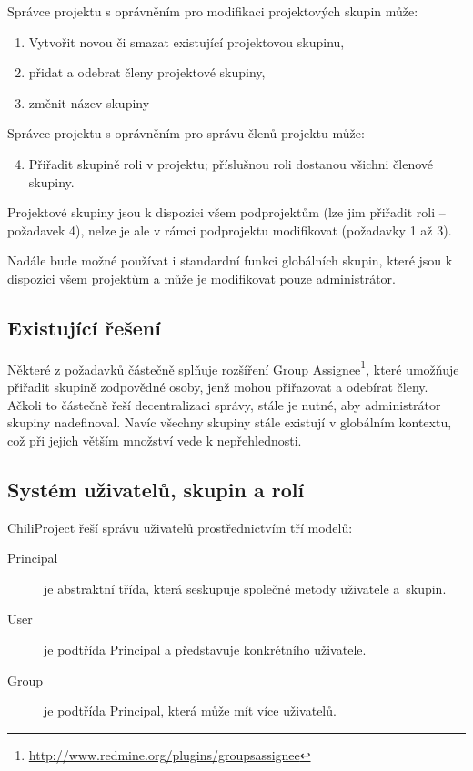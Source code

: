 \documentclass[thesis=B,czech]{FITthesis}[2012/05/02]
\begin{document}
Správce projektu s oprávněním pro modifikaci projektových skupin může:

\begin{enumerate}[1.]
\item
  Vytvořit novou či smazat existující projektovou skupinu,
\item
  přidat a odebrat členy projektové skupiny,
\item
  změnit název skupiny
\end{enumerate}
Správce projektu s oprávněním pro správu členů projektu může:

\begin{enumerate}[1.]
\setcounter{enumi}{3}
\item
  Přiřadit skupině roli v projektu; příslušnou roli dostanou všichni
  členové skupiny.
\end{enumerate}
Projektové skupiny jsou k dispozici všem podprojektům (lze jim přiřadit
roli -- požadavek 4), nelze je ale v rámci podprojektu modifikovat
(požadavky 1 až 3).

Nadále bude možné používat i standardní funkci globálních skupin, které
jsou k dispozici všem projektům a může je modifikovat pouze
administrátor.

\subsection{Existující řešení}

Některé z požadavků částečně splňuje rozšíření Group Assignee\footnote{\url{http://www.redmine.org/plugins/groupsassignee}},
které umožňuje přiřadit skupině zodpovědné osoby, jenž mohou přiřazovat a
odebírat členy. Ačkoli to částečně řeší decentralizaci správy, stále je
nutné, aby administrátor skupiny nadefinoval. Navíc všechny skupiny stále
existují v globálním kontextu, což při jejich větším množství vede
k nepřehlednosti.

\subsection{Systém uživatelů, skupin a rolí}

\label{sec:proj_group_sys}

ChiliProject řeší správu uživatelů prostřednictvím tří modelů:

\begin{description}
\item[Principal] je abstraktní třída, která seskupuje společné metody
  uživatele \mbox{a skupin}.
\item[User] je podtřída Principal a představuje konkrétního
  uživatele.
\item[Group] je podtřída Principal, která může mít více uživatelů.
\end{description}
\end{document}
